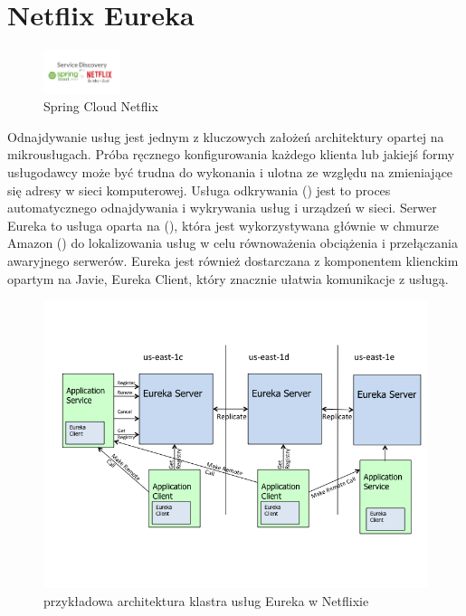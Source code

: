 \section{Netflix Eureka}

\begin{figure}[!htbp]
    \centering
    \includegraphics[width=0.2\textwidth]{images/netflixEureka/netflixEurekaLogo.png}
    \caption{Spring Cloud Netflix\cite{netflixEurekaMedium}}
    \label{fig:enter-label}
\end{figure}

Odnajdywanie usług jest jednym z kluczowych założeń architektury opartej na mikrousługach. Próba ręcznego konfigurowania każdego klienta lub jakiejś formy usługodawcy może być trudna do wykonania i ulotna ze względu na zmieniające się adresy w sieci komputerowej. Usługa odkrywania () jest to proces automatycznego odnajdywania i wykrywania usług i urządzeń w sieci. Serwer Eureka to usługa oparta na  (), która jest wykorzystywana głównie w chmurze Amazon  () do lokalizowania usług w celu równoważenia obciążenia i przełączania awaryjnego serwerów. Eureka jest również dostarczana z komponentem klienckim opartym na Javie, Eureka Client, który znacznie ułatwia komunikacje z usługą\cite{netflixEurekaArticleWang}\cite{netflixEurekaGithub}\cite{springEureka}\cite{netflixEurekaManual}.

\begin{figure}[!htbp]
    \centering
    \includegraphics[width=\textwidth, trim={0 4cm 0 0}]{images/netflixEureka/eureka_architecture.png}
    \caption{przykładowa architektura klastra usług Eureka w Netflixie\cite{netflixEurekaGithub}}
    \label{fig:enter-label}
\end{figure}

